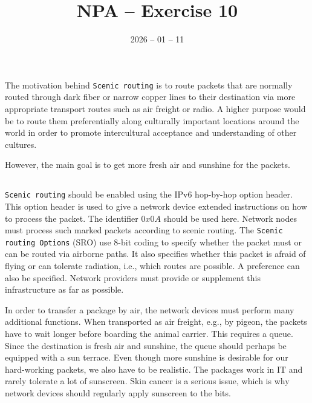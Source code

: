 \documentclass{article}
\date{2026 -- 01 -- 11}
\title{NPA -- Exercise 10}
\begin{document}
\maketitle
    
    \section{}
    \subsection{}

        The motivation behind \texttt{Scenic routing} is to route packets that are normally routed through dark fiber or narrow copper lines to their destination via more appropriate transport routes such as air freight or radio. A higher purpose would be to route them preferentially along culturally important locations around the world in order to promote intercultural acceptance and understanding of other cultures.
        
        However, the main goal is to get more fresh air and sunshine for the packets.
    
    \subsection{}

        \texttt{Scenic routing} should be enabled using the IPv6 hop-by-hop option header. This option header is used to give a network device extended instructions on how to process the packet. The identifier $0x0A$ should be used here. Network nodes must process such marked packets according to scenic routing. The \texttt{Scenic routing Options} (SRO) use 8-bit coding to specify whether the packet must or can be routed via airborne paths. It also specifies whether this packet is afraid of flying or can tolerate radiation, i.e., which routes are possible. A preference can also be specified. Network providers must provide or supplement this infrastructure as far as possible.

        In order to transfer a package by air, the network devices must perform many additional functions. When transported as air freight, e.g., by pigeon, the packets have to wait longer before boarding the animal carrier. This requires a queue. Since the destination is fresh air and sunshine, the queue should perhaps be equipped with a sun terrace. Even though more sunshine is desirable for our hard-working packets, we also have to be realistic. The packages work in IT and rarely tolerate a lot of sunscreen. Skin cancer is a serious issue, which is why network devices should regularly apply sunscreen to the bits.
    
\end{document}
